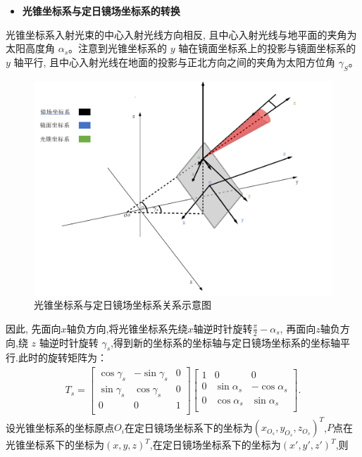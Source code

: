 \documentclass[../main.tex]{subfiles}
\begin{document}
\begin{itemize}
\item \textbf{光锥坐标系与定日镜场坐标系的转换}
\end{itemize}
\par 光锥坐标系入射光束的中心入射光线方向相反, 且中心入射光线与地平面的夹角为太阳高度角 $\alpha _s$。注意到光锥坐标系的 $y$ 轴在镜面坐标系上的投影与镜面坐标系的 $y$ 轴平行, 且中心入射光线在地面的投影与正北方向之间的夹角为太阳方位角 $\gamma_S$。
\begin{figure}[H]
\centering
\includegraphics[width=.9\textwidth]{5}
\caption{光锥坐标系与定日镜场坐标系关系示意图}
\label{1.16}
\end{figure}
\par 因此, 先面向$x$轴负方向,将光锥坐标系先绕$x$轴逆时针旋转$\frac{\pi}{2}-\alpha_s$, 再面向$z$轴负方向,绕 $z$ 轴逆时针旋转 $\gamma_s$,得到新的坐标系的坐标轴与定日镜场坐标系的坐标轴平行.此时的旋转矩阵为：
\begin{align}    \label{1.17}
T_s=\left[ \begin{matrix}
\cos \gamma _s&		-\sin \gamma _s&		0\\
\sin \gamma _s&		\cos \gamma _s&		0\\
0&		0&		1\\
\end{matrix} \right] \left[ \begin{matrix}
1&		0&		0\\
0&		\sin \alpha _s&		-\cos \alpha _s\\
0&		\cos \alpha _s&		\sin \alpha _s\\
\end{matrix} \right] .
\end{align}
设光锥坐标系的坐标原点$O_i$在定日镜场坐标系下的坐标为$(x_{O_s},y_{O_s},z_{O_s})^T$,$P$点在光锥坐标系下的坐标为$(x,y,z)^T$,在定日镜场坐标系下的坐标为$(x',y',z')^T$,则
\end{document}
